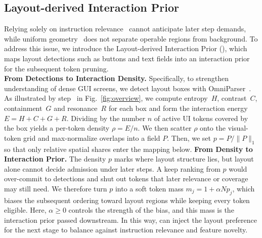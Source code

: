\subsection{Layout-derived Interaction Prior}
\label{sec:method-a}
%
Relying solely on instruction relevance~\citep{zhang2025cdpruner} cannot anticipate later step demands, while uniform geometry~\citep{deng2025scope} does not separate operable regions from background.
%
To address this issue, we introduce the Layout-derived Interaction Prior (\lmp{}), which maps layout detections such as buttons and text fields into an interaction prior for the subsequent token pruning.
\\
\noindent\textbf{From Detections to Interaction Density.}
Specifically, to strengthen understanding of dense GUI screens, we detect layout boxes with OmniParser~\citep{lu2024omniparser}.
%
As illustrated by step~ in Fig.~\ref{fig:overview}, we compute entropy~$H$, contrast~$C$, containment~$G$ and resonance~$R$ for each box and form the interaction energy $E=H+C+G+R$.
%
Dividing by the number $n$ of active UI tokens covered by the box yields a per-token density $\rho=E/n$.
%
We then scatter $\rho$ onto the visual-token grid and max-normalize overlaps into a field $P$.
%
Then, we set $p=P/\lVert P\rVert_1$ so that only relative spatial shares enter the mapping below.
%
\noindent\textbf{From Density to Interaction Prior.}
The density $p$ marks where layout structure lies, but layout alone cannot decide admission under later steps.
%
A keep ranking from $p$ would over-commit to detections and shut out tokens that later relevance or coverage may still need.
%
We therefore turn $p$ into a soft token mass $m_j=1+\alpha Np_j$, which biases the subsequent ordering toward layout regions while keeping every token eligible.
%
Here, $\alpha\geq 0$ controls the strength of the bias, and this mass is the interaction prior passed downstream.
%
In this way, \lmp{} can inject the layout preference for the next stage to balance against instruction relevance and feature novelty.

